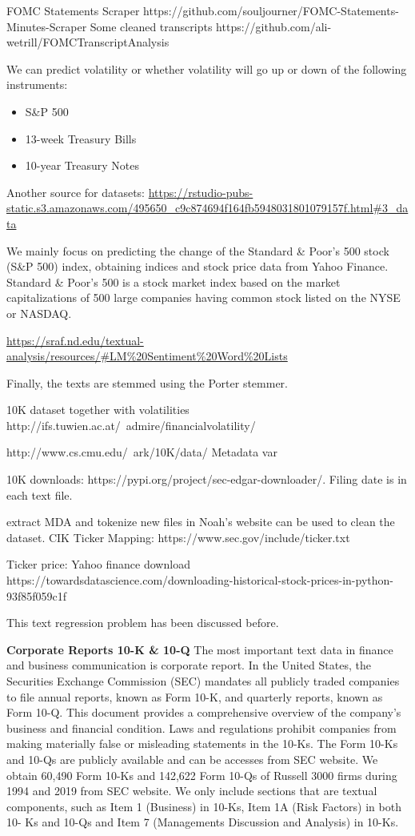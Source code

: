 \documentclass[11pt]{article}
\begin{document}
FOMC Statements Scraper
https://github.com/souljourner/FOMC-Statements-Minutes-Scraper
Some cleaned transcripts
https://github.com/ali-wetrill/FOMCTranscriptAnalysis

We can predict volatility or whether volatility will go up or down of the following instruments:
\begin{itemize}
\item S\&P 500
\item 13-week Treasury Bills
\item 10-year Treasury Notes
\end{itemize}

Another source for datasets: \url{https://rstudio-pubs-static.s3.amazonaws.com/495650_c9c874694f164fb5948031801079157f.html#3_data}

We mainly focus on predicting the change of the Standard \& Poor’s 500 stock (S\&P 500) index,
obtaining indices and stock price data from Yahoo Finance. Standard \& Poor’s 500 is a stock market index based
on the market capitalizations of 500 large companies having common stock listed on the NYSE or NASDAQ.

\url{https://sraf.nd.edu/textual-analysis/resources/#LM%20Sentiment%20Word%20Lists}

Finally, the texts are stemmed using the Porter stemmer.

10K dataset together with volatilities
http://ifs.tuwien.ac.at/~admire/financialvolatility/


http://www.cs.cmu.edu/~ark/10K/data/
Metadata var

10K downloads: https://pypi.org/project/sec-edgar-downloader/. Filing
date is in each text file.

extract MDA and tokenize new files in Noah's website can be used to clean the dataset.
CIK Ticker Mapping: https://www.sec.gov/include/ticker.txt

Ticker price: Yahoo finance download https://towardsdatascience.com/downloading-historical-stock-prices-in-python-93f85f059c1f

This text regression problem has been discussed before.


\textbf{Corporate Reports 10-K \& 10-Q} The most important text data in finance and business communication is corporate report. In the United States,
the Securities Exchange Commission (SEC) mandates all publicly traded companies to file annual
reports, known as Form 10-K, and quarterly reports, known as Form 10-Q. This document provides a comprehensive overview of the company’s
business and financial condition. Laws and regulations prohibit companies from making materially
false or misleading statements in the 10-Ks. The
Form 10-Ks and 10-Qs are publicly available and can be accesses from
SEC website. We obtain 60,490 Form 10-Ks and 142,622
Form 10-Qs of Russell 3000 firms during 1994 and
2019 from SEC website. We only include sections that are textual components, such as Item 1 (Business) in 10-Ks, Item 1A (Risk Factors) in both 10-
Ks and 10-Qs and Item 7 (Managements Discussion and Analysis) in 10-Ks.




\end{document}

